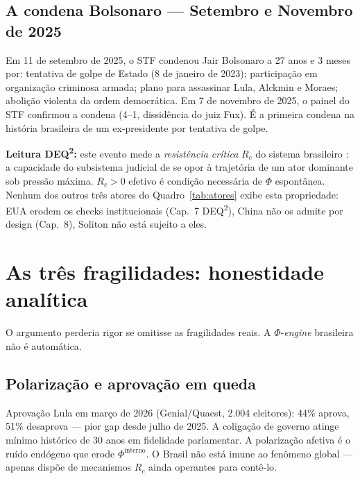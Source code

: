\documentclass[12pt]{article}
\theoremstyle{definition}
\theoremstyle{remark}
\begin{document}
\subsection{A condena Bolsonaro --- Setembro e Novembro de 2025}

Em 11 de setembro de 2025, o STF condenou Jair Bolsonaro a 27 anos e 3 meses por: tentativa de golpe de Estado (8 de janeiro de 2023); participa\c{c}\~{a}o em organiza\c{c}\~{a}o criminosa armada; plano para assassinar Lula, Alckmin e Moraes; aboli\c{c}\~{a}o violenta da ordem democr\'{a}tica. Em 7 de novembro de 2025, o painel do STF confirmou a condena (4--1, dissid\^{e}ncia do juiz Fux). \'{E} a primeira condena na hist\'{o}ria brasileira de um ex-presidente por tentativa de golpe.

\textbf{Leitura DEQ\textsuperscript{2}:} este evento mede a \textit{resist\^{e}ncia cr\'{i}tica} \(R_c\) do sistema brasileiro \citep{marcelino2026a}: a capacidade do subsistema judicial de se opor \`{a} trajet\'{o}ria de um ator dominante sob press\~{a}o m\'{a}xima. \(R_c > 0\) efetivo \'{e} condi\c{c}\~{a}o necess\'{a}ria de \(\Phi\) espont\^{a}nea. Nenhum dos outros tr\^{e}s atores do Quadro~\ref{tab:atores} exibe esta propriedade: EUA erodem os checks institucionais (Cap.~7 DEQ\textsuperscript{2}), China n\~{a}o os admite por design (Cap.~8), Soliton n\~{a}o est\'{a} sujeito a eles.

\section{As tr\^{e}s fragilidades: honestidade anal\'{i}tica}

O argumento perderia rigor se omitisse as fragilidades reais. A \(\Phi\)-\textit{engine} brasileira n\~{a}o \'{e} autom\'{a}tica.

\subsection{Polariza\c{c}\~{a}o e aprova\c{c}\~{a}o em queda}

Aprova\c{c}\~{a}o Lula em mar\c{c}o de 2026 (Genial/Quaest, 2.004 eleitores): 44\% aprova, 51\% desaprova --- pior gap desde julho de 2025. A coligação de governo atinge m\'{i}nimo hist\'{o}rico de 30 anos em fidelidade parlamentar. A polariza\c{c}\~{a}o afetiva \'{e} o ru\'{i}do end\'{o}geno que erode \(\Phi^{\text{interno}}\). O Brasil n\~{a}o est\'{a} imune ao fen\^{o}meno global --- apenas disp\~{o}e de mecanismos \(R_c\) ainda operantes para contê-lo.
\end{document}
